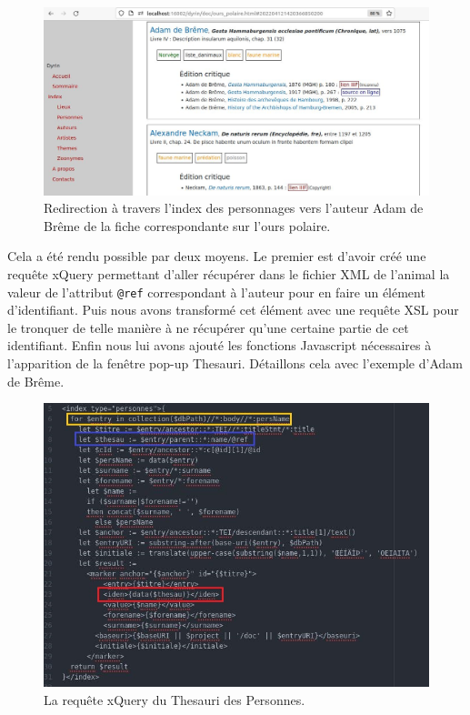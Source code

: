 \documentclass[a4paper,12pt,twoside]{book}
\begin{document}
\begin{figure}[H]
    \centering
    \includegraphics[width=\linewidth]{img/partie_3/breme_ours.JPG}
    \caption{Redirection à travers l'index des personnages vers l'auteur Adam de Brême de la fiche correspondante sur l'ours polaire.}
    \label{ours_breme}
\end{figure}

Cela a été rendu possible par deux moyens. Le premier est d'avoir créé une requête xQuery permettant d'aller récupérer dans le fichier XML de l'animal la valeur de l'attribut \texttt{@ref} correspondant à l'auteur pour en faire un élément d'identifiant. Puis nous avons transformé cet élément avec une requête \acrshort{XSL} pour le tronquer de telle manière à ne récupérer qu'une certaine partie de cet identifiant. Enfin nous lui avons ajouté les fonctions Javascript nécessaires à l'apparition de la fenêtre pop-up Thesauri. Détaillons cela avec l'exemple d'Adam de Brême.

\begin{figure}[H]
    \centering
    \includegraphics[width=\linewidth]{img/partie_3/xq_index_pers.JPG}
    \caption{La requête xQuery du Thesauri des Personnes.}
    \label{xq_pers}
\end{figure}
\end{document}
